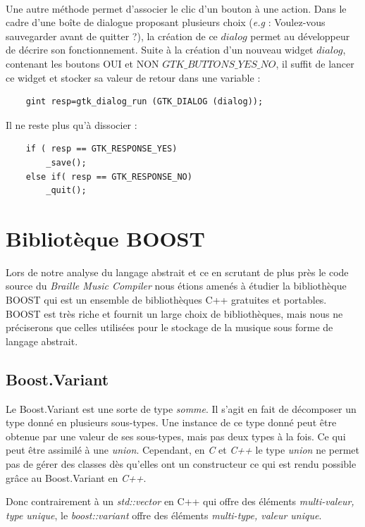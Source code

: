 \\

Une autre méthode permet d'associer le clic d'un bouton à une action.
Dans le cadre d'une boîte de dialogue proposant plusieurs choix (\textit{e.g} : Voulez-vous 
sauvegarder avant de quitter ?), la création de ce $dialog$ permet au développeur de décrire son 
fonctionnement. Suite à la création d'un nouveau widget $dialog$, contenant les boutons OUI et NON 
$GTK\_BUTTONS\_YES\_NO$, il suffit de lancer ce widget et stocker sa valeur de retour dans une variable :
\begin{verbatim}
	gint resp=gtk_dialog_run (GTK_DIALOG (dialog));
\end{verbatim}
Il ne reste plus qu'à dissocier :
\begin{verbatim}
	if ( resp == GTK_RESPONSE_YES)
		_save();
	else if( resp == GTK_RESPONSE_NO)
		_quit();
\end{verbatim}




\section{Bibliotèque BOOST}

Lors de notre analyse du langage abstrait et ce en scrutant de plus près le code source du \textit{Braille Music Compiler} nous étions amenés à étudier la bibliothèque BOOST  qui est un ensemble de bibliothèques C++ gratuites et portables. BOOST est très riche et fournit un large choix de bibliothèques, mais nous ne préciserons que celles utilisées pour le stockage de la musique sous forme de langage abstrait.


\subsection*{Boost.Variant}

Le Boost.Variant est une sorte de type \textit{somme}. Il s'agit en fait de décomposer un type donné en plusieurs sous-types. Une instance de ce type donné peut être obtenue par une valeur de ses sous-types, mais pas deux types à la fois. Ce qui peut être assimilé à une \textit{union}. Cependant, en \textit{C} et \textit{C++} le type \textit{union} ne permet pas de gérer des classes dès qu'elles ont un constructeur ce qui est rendu possible grâce au Boost.Variant en \textit{C++}.

Donc contrairement à un \textit{std::vector} en C++ qui offre des éléments \textit{multi-valeur, type unique}, le \textit{boost::variant} offre des éléments \textit{multi-type, valeur unique}.

